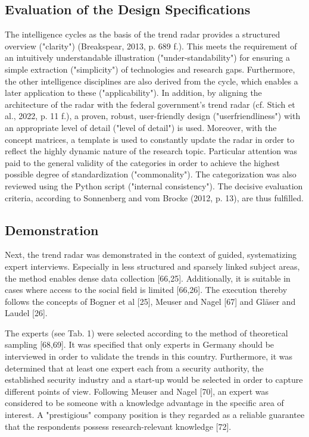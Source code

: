 \documentclass[10pt]{article}
\begin{document}
\subsection{Evaluation of the Design Specifications}

The intelligence cycles as the basis of the trend radar provides a
structured overview ("clarity") (Breakspear, 2013, p. 689 f.). This
meets the requirement of an intuitively understandable illustration
("under-standability") for ensuring a simple extraction ("simplicity")
of technologies and research gaps. Furthermore, the other intelligence
disciplines are also derived from the cycle, which enables a later
application to these ("applicability"). In addition, by aligning the
architecture of the radar with the federal government's trend radar
(cf. Stich et al., 2022, p. 11 f.), a proven, robust, user-friendly
design ("userfriendliness") with an appropriate level of detail
("level of detail") is used. Moreover, with the concept matrices, a
template is used to constantly update the radar in order to reflect
the highly dynamic nature of the research topic. Particular attention
was paid to the general validity of the categories in order to achieve
the highest possible degree of standardization ("commonality"). The
categorization was also reviewed using the Python script ("internal
consistency"). The decisive evaluation criteria, according to
Sonnenberg and vom Brocke (2012, p. 13), are thus fulfilled.

\subsection{Demonstration}

Next, the trend radar was demonstrated in the context of guided,
systematizing expert interviews. Especially in less structured and
sparsely linked subject areas, the method enables dense data collection
    [66,25]. Additionally, it is suitable in cases where access to the
social field is limited [66,26]. The execution thereby follows the
concepts of Bogner et al [25], Meuser and Nagel [67] and Gläser and
Laudel [26].

The experts (see Tab. 1) were selected according to the method of
theoretical sampling [68,69]. It was specified that only experts in
Germany should be interviewed in order to validate the trends in this
country. Furthermore, it was determined that at least one expert each
from a security authority, the established security industry and a
start-up would be selected in order to capture different points of
view. Following Meuser and Nagel [70], an expert was considered to be
someone with a knowledge advantage in the specific area of interest.
A "prestigious" company position is they regarded as a reliable
guarantee that the respondents possess research-relevant knowledge [72].
\end{document}
